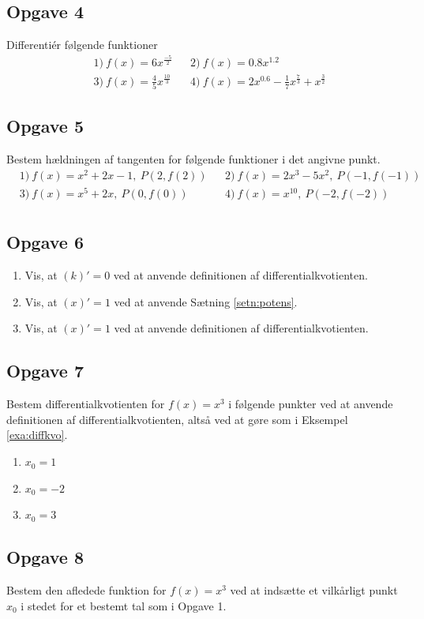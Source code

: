 \subsection*{Opgave 4}
Differentiér følgende funktioner
\begin{align*}
	&1) \ f(x) = 6x^{\frac{-5}{2}}  &&2) \  f(x) = 0.8x^{1.2}  \\
	&3) \ f(x) = \frac{4}{5}x^{\frac{10}{3}} &&4) \ f(x) =2x^{0.6}-\frac{1}{7}x^{\frac{7}{3}} + x^{\frac{3}{2}} 
\end{align*} 

\subsection*{Opgave 5}
Bestem hældningen af tangenten for følgende funktioner i det angivne punkt.
\begin{align*}
	&1) \ f(x) = x^2 + 2x -1, \ P(2,f(2)) &&2) \ f(x) = 2x^3-5x^2, \ P(-1,f(-1))\\
	&3) \ f(x) = x^{5}+2x, \ P(0,f(0)) &&4) \ f(x) =x^10 , \ P(-2,f(-2))\\
\end{align*}

\subsection*{Opgave 6}
\begin{enumerate}[label=\roman*)]
	\item Vis, at $(k)' = 0$ ved at anvende definitionen af differentialkvotienten.
	\item Vis, at $(x)' = 1$ ved at anvende Sætning \ref{setn:potens}.
	\item Vis, at $(x)' = 1$ ved at anvende definitionen af differentialkvotienten. 
\end{enumerate}

\subsection*{Opgave 7}
Bestem differentialkvotienten for $f(x) = x^3$ i følgende punkter ved at anvende definitionen af differentialkvotienten, altså ved at gøre som i Eksempel \ref{exa:diffkvo}.
\begin{enumerate}[label=\roman*)]
	\item $x_0 = 1$
	\item $x_0 = -2$
	\item $x_0 = 3$
\end{enumerate}

\subsection*{Opgave 8}
Bestem den afledede funktion for $f(x) = x^3$ ved at indsætte et vilkårligt punkt $x_0$ i stedet for et bestemt tal som i Opgave 1.
